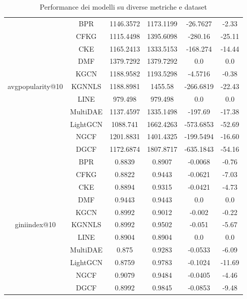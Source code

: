 \begin{table}[H]
{\begin{tabular}{|c|c|c|c|c|c|}
        \multirow{11}{*}{avgpopularity@10} 
            & BPR & 1146.3572 & 1173.1199 & -26.7627 & -2.33 \\ \cline{2-6} 
            & CFKG & 1115.4498 & 1395.6098 & -280.16 & -25.11 \\ \cline{2-6} 
            & CKE & 1165.2413 & 1333.5153 & -168.274 & -14.44 \\ \cline{2-6} 
            & DMF & 1379.7292 & 1379.7292 & 0.0 & 0.0 \\ \cline{2-6} 
            & KGCN & 1188.9582 & 1193.5298 & -4.5716 & -0.38 \\ \cline{2-6} 
            & KGNNLS & 1188.8981 & 1455.58 & -266.6819 & -22.43 \\ \cline{2-6} 
            & LINE & 979.498 & 979.498 & 0.0 & 0.0 \\ \cline{2-6} 
            & MultiDAE & 1137.4597 & 1335.1498 & -197.69 & -17.38 \\ \cline{2-6} 
            & LightGCN & 1088.741 & 1662.4263 & -573.6853 & -52.69 \\ \cline{2-6} 
            & NGCF & 1201.8831 & 1401.4325 & -199.5494 & -16.60 \\ \cline{2-6} 
            & DGCF & 1172.6874 & 1807.8717 & -635.1843 & -54.16 \\ \hline

        \multirow{11}{*}{giniindex@10} 
            & BPR & 0.8839 & 0.8907 & -0.0068 & -0.76 \\ \cline{2-6} 
            & CFKG & 0.8822 & 0.9443 & -0.0621 & -7.03 \\ \cline{2-6} 
            & CKE & 0.8894 & 0.9315 & -0.0421 & -4.73 \\ \cline{2-6} 
            & DMF & 0.9443 & 0.9443 & 0.0 & 0.0 \\ \cline{2-6} 
            & KGCN & 0.8992 & 0.9012 & -0.002 & -0.22 \\ \cline{2-6} 
            & KGNNLS & 0.8992 & 0.9502 & -0.051 & -5.67 \\ \cline{2-6} 
            & LINE & 0.8904 & 0.8904 & 0.0 & 0.0 \\ \cline{2-6} 
            & MultiDAE & 0.875 & 0.9283 & -0.0533 & -6.09 \\ \cline{2-6} 
            & LightGCN & 0.8759 & 0.9783 & -0.1024 & -11.69 \\ \cline{2-6} 
            & NGCF & 0.9079 & 0.9484 & -0.0405 & -4.46 \\ \cline{2-6} 
            & DGCF & 0.8992 & 0.9845 & -0.0853 & -9.48 \\ \hline
    \end{tabular}
    }
    \caption{Performance dei modelli su diverse metriche e dataset}
\end{table}

